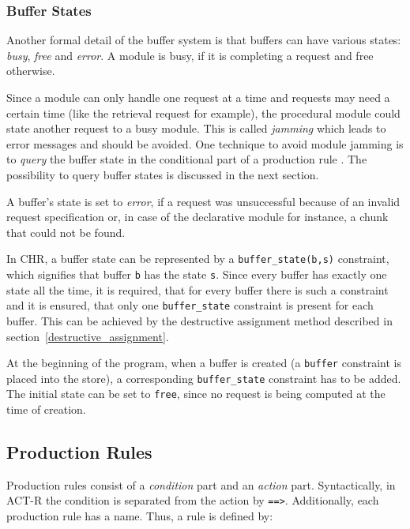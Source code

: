 \subsubsection{Buffer States}

Another formal detail of the buffer system is that buffers can have various states: \emph{busy}, \emph{free} and \emph{error}. A module is busy, if it is completing a request and free otherwise.

Since a module can only handle one request at a time and requests may need a certain time (like the retrieval request for example), the procedural module could state another request to a busy module. This is called \emph{jamming} which leads to error messages and should be avoided. One technique to avoid module jamming is to \emph{query} the buffer state in the conditional part of a production rule \cite[unit 2, p. 9]{actr_tutorial}. The possibility to query buffer states is discussed in the next section.

A buffer's state is set to \emph{error}, if a request was unsuccessful because of an invalid request specification or, in case of the declarative module for instance, a chunk that could not be found.

In CHR, a buffer state can be represented by a \lstinline|buffer_state(b,s)| constraint, which signifies that buffer \lstinline|b| has the state \lstinline|s|. Since every buffer has exactly one state all the time, it is required, that for every buffer there is such a constraint and it is ensured, that only one \lstinline|buffer_state| constraint is present for each buffer. This can be achieved by the destructive assignment method described in section~\ref{destructive_assignment}. 

At the beginning of the program, when a buffer is created (a \lstinline|buffer| constraint is placed into the store), a corresponding \lstinline|buffer_state| constraint has to be added. The initial state can be set to \lstinline|free|, since no request is being computed at the time of creation.

\subsection{Production Rules}
\label{implementation:production_rules}

Production rules consist of a \emph{condition} part and an \emph{action} part. Syntactically, in ACT-R the condition is separated from the action by \lstinline|==>|. Additionally, each production rule has a name. Thus, a rule is defined by:

